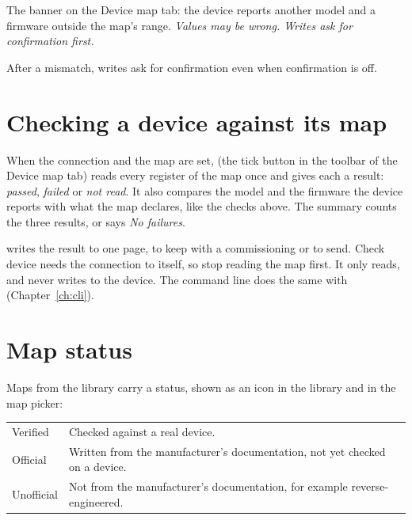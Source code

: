   {The banner on the Device map tab: the device reports another model and a
   firmware outside the map's range. \emph{Values may be wrong. Writes ask for
   confirmation first.}}

\begin{warning}
After a mismatch, writes ask for confirmation even when confirmation is off.
\end{warning}

\section{Checking a device against its map}
\label{sec:check}

When the connection and the map are set,  (the tick button in
the toolbar of the Device map tab) reads every register of the map once and
gives each a result: \emph{passed}, \emph{failed} or \emph{not read}. It also
compares the model and the firmware the device reports with what the map
declares, like the checks above. The summary counts the three results, or says
\emph{No failures}.

 writes the result to one page, to keep with a
commissioning or to send. Check device needs the connection to itself, so stop
reading the map first. It only reads, and never writes to the device. The
command line does the same with 
(Chapter~\ref{ch:cli}).

\section{Map status}
\label{sec:map-status}

Maps from the library carry a status, shown as an icon in the library and in
the map picker:

\begin{center}
\begin{tabularx}{\linewidth}{l L}
  \toprule
   &  \\
  \midrule
  Verified & Checked against a real device. \\
  Official & Written from the manufacturer's documentation, not yet
    checked on a device. \\
  Unofficial & Not from the manufacturer's documentation, for example
    reverse-engineered. \\
  \bottomrule
\end{tabularx}
\end{center}

